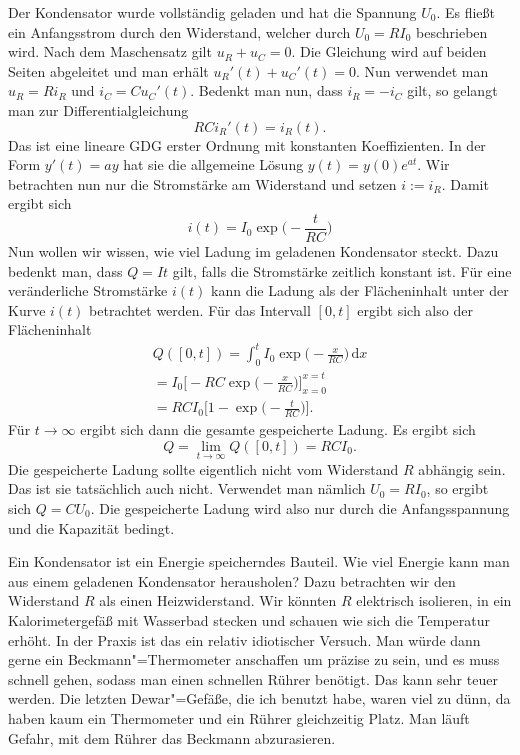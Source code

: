 \documentclass[a4paper,10pt,fleqn,twocolumn,twoside,dvipdfmx]{scrartcl}
\numberwithin{equation}{section}
\begin{document}
\noindent
Der Kondensator wurde vollständig geladen und hat die Spannung
$U_0$. Es fließt ein Anfangsstrom durch den Widerstand, welcher
durch $U_0=RI_0$ beschrieben wird. Nach dem Maschensatz
gilt $u_R+u_C=0$.
Die Gleichung wird auf beiden Seiten abgeleitet und man erhält
$u_R'(t)+u_C'(t)=0$. Nun verwendet man $u_R=Ri_R$ und $i_C=Cu_C'(t)$.
Bedenkt man nun, dass $i_R=-i_C$ gilt, so gelangt man zur
Differentialgleichung%
\begin{equation}
RCi_R'(t) = i_R(t).
\end{equation}
Das ist eine lineare GDG erster Ordnung mit konstanten Koeffizienten.
In der Form $y'(t)=ay$ hat sie die allgemeine Lösung
$y(t)=y(0)e^{at}$. Wir betrachten nun nur die Stromstärke am
Widerstand und setzen $i:=i_R$. Damit ergibt sich%
\begin{equation}\label{RCStrom}
i(t) = I_0\exp\Big(-\frac{t}{RC}\Big)
\end{equation}
Nun wollen wir wissen, wie viel Ladung im geladenen Kondensator
steckt. Dazu bedenkt man, dass $Q=It$ gilt, falls die Stromstärke
zeitlich konstant ist. Für eine veränderliche Stromstärke $i(t)$
kann die Ladung als der Flächeninhalt unter der Kurve $i(t)$
betrachtet werden. Für das Intervall $[0,t]$ ergibt sich also
der Flächeninhalt%
\begin{gather*}
Q([0,t]) = \int_0^t I_0 \exp\Big(-\frac{x}{RC}\Big)\,\mathrm dx\\
= I_0\Big[-RC\exp\Big(-\frac{x}{RC}\Big)\Big]_{x=0}^{x=t}\\
= RC I_0 \Big[1-\exp\Big(-\frac{t}{RC}\Big)\Big].
\end{gather*}
Für $t\rightarrow\infty$ ergibt sich dann die gesamte gespeicherte
Ladung. Es ergibt sich%
\begin{equation}
Q = \lim_{t\rightarrow\infty}Q([0,t]) = RCI_0.
\end{equation}
Die gespeicherte Ladung sollte eigentlich nicht vom Widerstand
$R$ abhängig sein. Das ist sie tatsächlich auch nicht. Verwendet
man nämlich $U_0=RI_0$, so ergibt sich $Q=CU_0$. Die gespeicherte
Ladung wird also nur durch die Anfangsspannung und die Kapazität
bedingt.

Ein Kondensator ist ein Energie speicherndes Bauteil. Wie viel
Energie kann man aus einem geladenen Kondensator herausholen?
Dazu betrachten wir den Widerstand $R$ als einen Heizwiderstand.
Wir könnten $R$ elektrisch isolieren, in ein Kalorimetergefäß
mit Wasserbad stecken und schauen wie sich die Temperatur erhöht.
In der Praxis ist das ein relativ idiotischer Versuch. Man würde
dann gerne ein Beckmann"=Thermometer anschaffen um präzise zu sein,
und es muss schnell gehen, sodass man einen schnellen Rührer
benötigt. Das kann sehr teuer werden. Die letzten Dewar"=Gefäße,
die ich benutzt habe, waren viel zu dünn, da haben kaum ein
Thermometer und ein Rührer gleichzeitig Platz. Man läuft Gefahr,
mit dem Rührer das Beckmann abzurasieren. 
\end{document}
